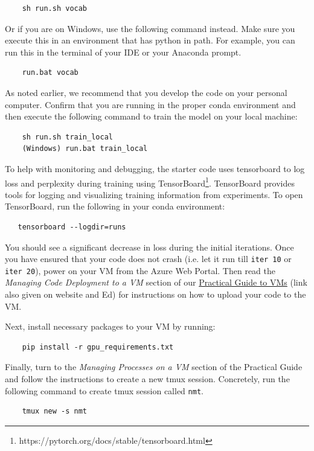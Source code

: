 \begin{lstlisting}
    sh run.sh vocab
\end{lstlisting}

Or if you are on Windows, use the following command instead. Make sure you execute this in an environment that has python in path. For example, you can run this in the terminal of your IDE or your Anaconda prompt.


\begin{lstlisting}
    run.bat vocab
\end{lstlisting}

As noted earlier, we recommend that you develop the code on your personal computer.  Confirm that you are running in the proper conda environment and then execute the following command to train the model on your local machine:
    
\begin{lstlisting}
    sh run.sh train_local
    (Windows) run.bat train_local
\end{lstlisting}

To help with monitoring and debugging, the starter code uses tensorboard to log loss and perplexity during training using TensorBoard\footnote{https://pytorch.org/docs/stable/tensorboard.html}. TensorBoard provides tools for logging and visualizing training information from experiments. To open TensorBoard, run the following in your conda environment:

\begin{lstlisting}
   tensorboard --logdir=runs
\end{lstlisting}

You should see a significant decrease in loss during the initial iterations. Once you have ensured that your code does not crash (i.e. let it run till \texttt{iter 10} or \texttt{iter 20}), power on your VM from the Azure Web Portal. Then read the \textit{Managing Code Deployment to a VM} section of our \href{https://docs.google.com/document/d/1jtANWXbIYXMZO_2X7jupauPxcEbz-TVJkdatg4gzOdk}{Practical Guide to VMs} (link also given on website and Ed) for instructions on how to upload your code to the VM.

Next, install necessary packages to your VM by running:
    
\begin{lstlisting}
    pip install -r gpu_requirements.txt
\end{lstlisting}

Finally, turn to the \textit{Managing Processes on a VM} section of the Practical Guide and follow the instructions to create a new tmux session. Concretely, run the following command to create tmux session called \texttt{nmt}. 
\begin{lstlisting}
    tmux new -s nmt
\end{lstlisting}


